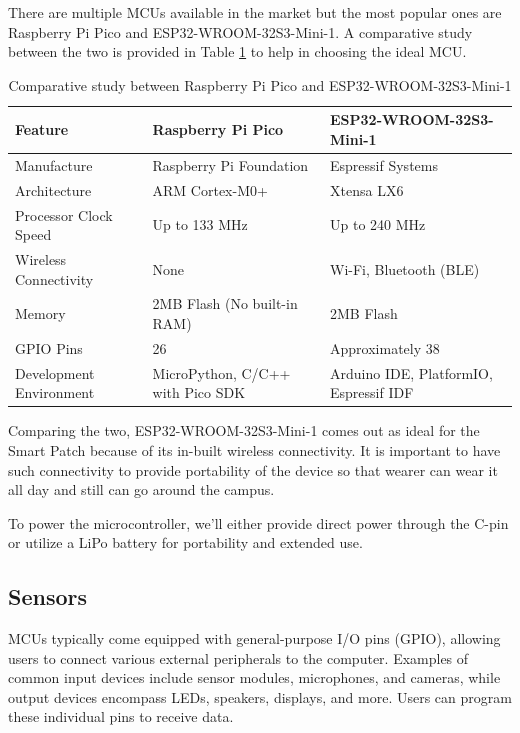 \noindent There are multiple MCUs available in the market but the most popular ones are Raspberry Pi Pico and ESP32-WROOM-32S3-Mini-1. A comparative study between the two is provided in Table \ref{table:microcontrollers} to help in choosing the ideal MCU. \\

\begin{table}[h!]
\centering
\begin{tabularx}{\textwidth}{|X|X|X|}
\hline
\textbf{Feature} & \textbf{Raspberry Pi Pico} & \textbf{ESP32-WROOM-32S3-Mini-1} \\ \hline
Manufacture & Raspberry Pi Foundation & Espressif Systems \\ \hline
Architecture & ARM Cortex-M0+ & Xtensa LX6 \\ \hline
Processor Clock Speed & Up to 133 MHz & Up to 240 MHz \\ \hline
Wireless Connectivity & None & Wi-Fi, Bluetooth (BLE) \\ \hline
Memory & 2MB Flash (No built-in RAM) & 2MB Flash \\ \hline
GPIO Pins & 26 & Approximately 38 \\ \hline
Development Environment & MicroPython, C/C++ with Pico SDK & Arduino IDE, PlatformIO, Espressif IDF \\ \hline
\end{tabularx}
\caption{Comparative study between Raspberry Pi Pico and ESP32-WROOM-32S3-Mini-1}
\label{table:microcontrollers}
\end{table} 

\noindent Comparing the two, ESP32-WROOM-32S3-Mini-1 comes out as ideal for the Smart Patch because of its in-built wireless connectivity. It is important to have such connectivity to provide portability of the device so that wearer can wear it all day and still can go around the campus.

\noindent To power the microcontroller, we'll either provide direct power through the C-pin or utilize a LiPo battery for portability and extended use.

\subsection{Sensors}
MCUs typically come equipped with general-purpose I/O pins (GPIO), allowing users to connect various external peripherals to the computer. Examples of common input devices include sensor modules, microphones, and cameras, while output devices encompass LEDs, speakers, displays, and more. Users can program these individual pins to receive data. 

